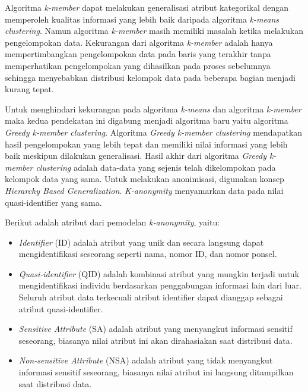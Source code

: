 \par Algoritma \textit{k-member} dapat melakukan generalisasi atribut kategorikal dengan memperoleh kualitas informasi yang lebih baik daripada algoritma \textit{k-means clustering}. Namun algoritma \textit{k-member} masih memiliki masalah ketika melakukan pengelompokan data. Kekurangan dari algoritma \textit{k-member} adalah hanya mempertimbangkan pengelompokan data pada baris yang terakhir tanpa memperhatikan pengelompokan yang dihasilkan pada proses sebelumnya sehingga menyebabkan distribusi kelompok data pada beberapa bagian menjadi kurang tepat. 

\par Untuk menghindari kekurangan pada algoritma \textit{k-means} dan algoritma \textit{k-member} maka kedua pendekatan ini digabung menjadi algoritma baru yaitu algoritma \textit{Greedy k-member clustering}. Algoritma \textit{Greedy k-member clustering} mendapatkan hasil pengelompokan yang lebih tepat dan memiliki nilai informasi yang lebih baik meskipun dilakukan generalisasi. Hasil akhir dari algoritma \textit{Greedy k-member clustering} adalah data-data yang sejenis telah dikelompokan pada kelompok data yang sama. Untuk melakukan anonimisasi, digunakan konsep \textit{Hierarchy Based Generalization}. \textit{K-anonymity} menyamarkan data pada nilai quasi-identifier yang sama. 

\vspace{0.5cm}
\noindent Berikut adalah atribut dari pemodelan \textit{k-anonymity}, yaitu:
 
\begin{itemize}
\item \textit{Identifier} (ID) adalah atribut yang unik dan secara langsung dapat mengidentifikasi seseorang seperti nama, nomor ID, dan nomor ponsel.
\item \textit{Quasi-identifier} (QID) adalah kombinasi atribut yang mungkin terjadi untuk mengidentifikasi individu berdasarkan penggabungan informasi lain dari luar. Seluruh atribut data terkecuali atribut identifier dapat dianggap sebagai atribut quasi-identifier.
\item \textit{Sensitive Attribute} (SA) adalah atribut yang menyangkut informasi  sensitif seseorang, biasanya nilai atribut ini akan dirahasiakan saat distribusi data.
\item \textit{Non-sensitive Attribute} (NSA) adalah atribut yang tidak menyangkut informasi sensitif seseorang, biasanya nilai atribut ini langsung ditampilkan saat distribusi data.
\end{itemize}


